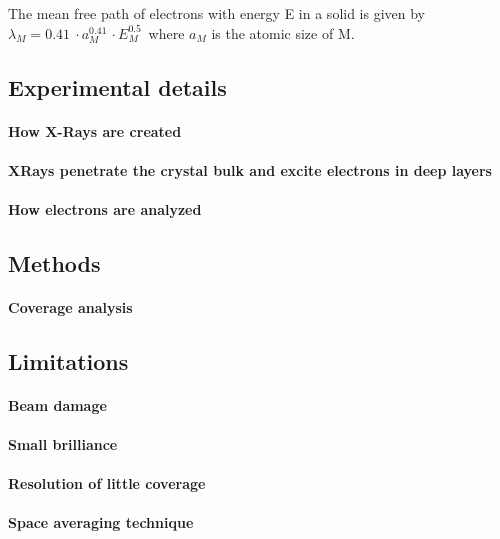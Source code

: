 The mean free path of electrons with energy E in a solid is given by $\lambda_M=\SI{0,41}{}\cdot a_M^{\SI{0,41}{}}\cdot E_M^{\SI{0,5}{}} $ where $a_M$ is the atomic size of M. 

\subsection{Experimental details}
	\paragraph{How X-Rays are created}
	\paragraph{XRays penetrate the crystal bulk and excite electrons in deep layers}
	\paragraph{How electrons are analyzed}
\subsection{Methods}
	\paragraph{Coverage analysis}
\subsection{Limitations}
	\paragraph{Beam damage}
	\paragraph{Small brilliance}
	\paragraph{Resolution of little coverage}
	\paragraph{Space averaging technique}